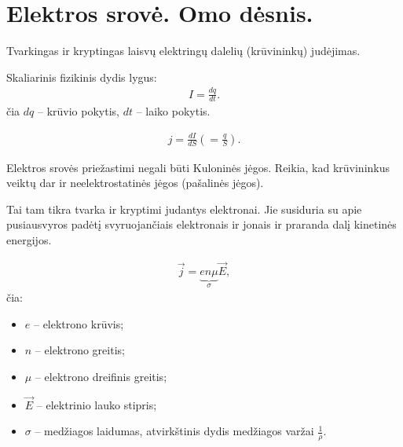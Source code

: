 \section{Elektros srovė. Omo dėsnis.}

\begin{defn}
  Tvarkingas ir kryptingas laisvų elektringų dalelių (krūvininkų)
  judėjimas.
\end{defn}

\begin{defn}
  Skaliarinis fizikinis dydis lygus:
  \begin{align*}
    I = \frac{dq}{dt}.
  \end{align*}
  čia $dq$ – krūvio pokytis, $dt$ – laiko pokytis.
\end{defn}

\begin{defn}
  \begin{align*}
    j = \frac{dI}{dS} \left( = \frac{q}{S} \right).
  \end{align*}
\end{defn}

Elektros srovės priežastimi negali būti Kuloninės jėgos. Reikia, kad
krūvininkus veiktų dar ir neelektrostatinės jėgos (pašalinės jėgos).

\begin{defn}
  Tai tam tikra tvarka ir kryptimi judantys elektronai. Jie susiduria su
  apie pusiausvyros padėtį svyruojančiais elektronais ir jonais ir
  praranda dalį kinetinės energijos.
\end{defn}

\begin{defn}
  \begin{align*}
    \vec{j} = \underbrace{en\mu}_{\sigma}\vec{E},
  \end{align*}
  čia:
  \begin{itemize}
    \item $e$ – elektrono krūvis;
    \item $n$ – elektrono greitis;
    \item $\mu$ – elektrono dreifinis greitis;
    \item $\vec{E}$ – elektrinio lauko stipris;
    \item $\sigma$ – medžiagos laidumas, atvirkštinis dydis
      medžiagos varžai $\frac{1}{\rho}$.
  \end{itemize}
\end{defn}

